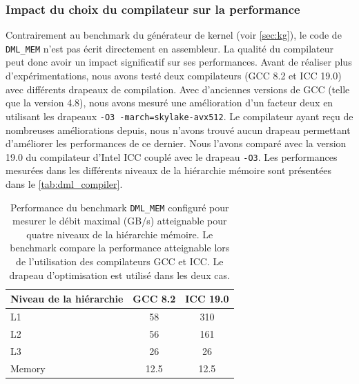     \subsubsection{Impact du choix du compilateur sur la performance}
    
        Contrairement au benchmark du générateur de kernel (voir \autoref{sec:kg}), le code de \verb=DML_MEM= n'est pas écrit directement en assembleur. La qualité du compilateur peut donc avoir un impact significatif sur ses performances. Avant de réaliser plus d'expérimentations, nous avons testé deux compilateurs (GCC 8.2 et ICC 19.0) avec différents drapeaux de compilation. Avec d'anciennes versions de GCC (telle que la version 4.8), nous avons mesuré une amélioration d'un facteur deux en utilisant les drapeaux \verb|-O3 -march=skylake-avx512|. Le compilateur ayant reçu de nombreuses améliorations depuis, nous n'avons trouvé aucun drapeau permettant d'améliorer les performances de ce dernier. Nous l'avons comparé avec la version 19.0 du compilateur d'Intel ICC couplé avec le drapeau \verb|-O3|. Les performances mesurées dans les différents niveaux de la hiérarchie mémoire sont présentées dans le \autoref{tab:dml_compiler}.

        \begin{table}[h!]
        \centering
        \begin{tabular}{|l|c|c|}
        \hline
        Niveau de la hiérarchie & GCC 8.2 & ICC 19.0 \\ \hline
        L1 & 58 & 310 \\ \hline
        L2 & 56 & 161 \\ \hline
        L3 & 26 & 26 \\ \hline
        Memory & 12.5 & 12.5 \\ \hline
        \end{tabular}%
        \caption{Performance du benchmark \texttt{DML\_MEM} configuré pour mesurer le débit maximal (GB/s) atteignable pour quatre niveaux de la hiérarchie mémoire. Le benchmark compare la performance atteignable lors de l'utilisation des compilateurs GCC et ICC. Le drapeau d'optimisation  est utilisé dans les deux cas.}
        \label{tab:dml_compiler}
        \end{table}

